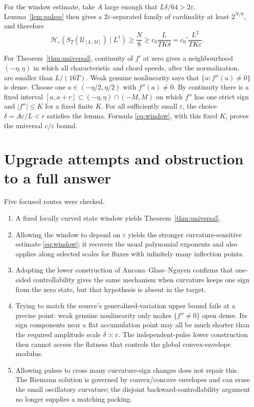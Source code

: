 \documentclass[11pt]{article}
\newcommand{\Hent}{\mathcal H}
\newcommand{\Uclass}{\mathcal U}
\begin{document}
For the window estimate, take \(A\) large enough that
\(L\delta/64>2\varepsilon\).  Lemma~\ref{lem:pulses} then gives a
\(2\varepsilon\)-separated family of cardinality at least \(2^{N/8}\), and
therefore
\[
 \Hent_\varepsilon(S_T(\Uclass_{[L,M]})\mid L^1)
 \geq \frac{N}{8}
 \geq c_0\frac{L}{TK\delta}
 =c_0'\frac{L^2}{TK\varepsilon}.
\]

For Theorem~\ref{thm:universal}, continuity of \(f'\) at zero gives a
neighbourhood \((-\eta,\eta)\) in which all characteristic and chord speeds,
after the normalization, are smaller than \(L/(16T)\).  Weak genuine
nonlinearity says that \(\{u:f''(u)\ne0\}\) is dense.  Choose one
\(a\in(-\eta/2,\eta/2)\) with \(f''(a)\ne0\).  By continuity there is a
fixed interval \([a,a+r]\subset(-\eta,\eta)\cap(-M,M)\) on which \(f''\)
has one strict sign and \(|f''|\leq K\) for a fixed finite \(K\).
For all sufficiently small \(\varepsilon\), the choice
\(\delta=A\varepsilon/L<r\) satisfies the lemma.  Formula
\eqref{eq:window}, with this fixed \(K\), proves the universal
\(c/\varepsilon\) bound.

\section*{Upgrade attempts and obstruction to a full answer}

Five focused routes were checked.

\begin{enumerate}
\item A fixed locally curved state window yields Theorem~\ref{thm:universal}.
\item Allowing the window to depend on \(\varepsilon\) yields the stronger
curvature-sensitive estimate \eqref{eq:window}; it recovers the usual
polynomial exponents and also applies along selected scales for fluxes with
infinitely many inflection points.
\item Adapting the lower construction of Ancona--Glass--Nguyen confirms that
one-sided controllability gives the same mechanism when curvature keeps one
sign from the zero state, but that hypothesis is absent in the target.
\item Trying to match the source's generalized-variation upper bound fails
at a precise point: weak genuine nonlinearity only makes
\(\{f''\ne0\}\) open dense.  Its sign components near a flat accumulation
point may all be much shorter than the required amplitude scale
\(\delta\asymp\varepsilon\).  The independent-pulse lower construction then
cannot access the flatness that controls the global convex-envelope modulus.
\item Allowing pulses to cross many curvature-sign changes does not repair
this.  The Riemann solution is governed by convex/concave envelopes and can
erase the small oscillatory curvature; the disjoint backward-controllability
argument no longer supplies a matching packing.
\end{enumerate}
\end{document}
